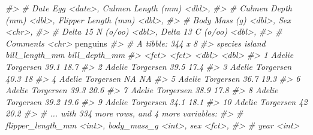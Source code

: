 \documentclass[
]{book}
\newenvironment{Shaded}{\begin{snugshade}}{\end{snugshade}}
\newcommand{\CommentTok}[1]{\textcolor[rgb]{0.56,0.35,0.01}{\textit{#1}}}
\newcommand{\NormalTok}[1]{#1}
\begin{document}
\begin{Shaded}
\begin{Highlighting}[]
\CommentTok{\#\textgreater{} \#   Date Egg \textless{}date\textgreater{}, Culmen Length (mm) \textless{}dbl\textgreater{},}
\CommentTok{\#\textgreater{} \#   Culmen Depth (mm) \textless{}dbl\textgreater{}, Flipper Length (mm) \textless{}dbl\textgreater{},}
\CommentTok{\#\textgreater{} \#   Body Mass (g) \textless{}dbl\textgreater{}, Sex \textless{}chr\textgreater{},}
\CommentTok{\#\textgreater{} \#   Delta 15 N (o/oo) \textless{}dbl\textgreater{}, Delta 13 C (o/oo) \textless{}dbl\textgreater{},}
\CommentTok{\#\textgreater{} \#   Comments \textless{}chr\textgreater{}}
\NormalTok{penguins}
\CommentTok{\#\textgreater{} \# A tibble: 344 x 8}
\CommentTok{\#\textgreater{}    species island    bill\_length\_mm bill\_depth\_mm}
\CommentTok{\#\textgreater{}    \textless{}fct\textgreater{}   \textless{}fct\textgreater{}              \textless{}dbl\textgreater{}         \textless{}dbl\textgreater{}}
\CommentTok{\#\textgreater{}  1 Adelie  Torgersen           39.1          18.7}
\CommentTok{\#\textgreater{}  2 Adelie  Torgersen           39.5          17.4}
\CommentTok{\#\textgreater{}  3 Adelie  Torgersen           40.3          18  }
\CommentTok{\#\textgreater{}  4 Adelie  Torgersen           NA            NA  }
\CommentTok{\#\textgreater{}  5 Adelie  Torgersen           36.7          19.3}
\CommentTok{\#\textgreater{}  6 Adelie  Torgersen           39.3          20.6}
\CommentTok{\#\textgreater{}  7 Adelie  Torgersen           38.9          17.8}
\CommentTok{\#\textgreater{}  8 Adelie  Torgersen           39.2          19.6}
\CommentTok{\#\textgreater{}  9 Adelie  Torgersen           34.1          18.1}
\CommentTok{\#\textgreater{} 10 Adelie  Torgersen           42            20.2}
\CommentTok{\#\textgreater{} \# ... with 334 more rows, and 4 more variables:}
\CommentTok{\#\textgreater{} \#   flipper\_length\_mm \textless{}int\textgreater{}, body\_mass\_g \textless{}int\textgreater{}, sex \textless{}fct\textgreater{},}
\CommentTok{\#\textgreater{} \#   year \textless{}int\textgreater{}}


\end{Highlighting}
\end{Shaded}
\end{document}
